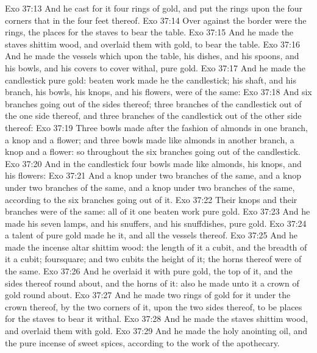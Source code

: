 \vs Exo 37:13 And he cast for it four rings of gold, and put the rings upon the four corners that  in the four feet thereof.
\vs Exo 37:14 Over against the border were the rings, the places for the staves to bear the table.
\vs Exo 37:15 And he made the staves  shittim wood, and overlaid them with gold, to bear the table.
\vs Exo 37:16 And he made the vessels which  upon the table, his dishes, and his spoons, and his bowls, and his covers to cover withal,  pure gold.
\vs Exo 37:17 And he made the candlestick  pure gold:  beaten work made he the candlestick; his shaft, and his branch, his bowls, his knops, and his flowers, were of the same:
\vs Exo 37:18 And six branches going out of the sides thereof; three branches of the candlestick out of the one side thereof, and three branches of the candlestick out of the other side thereof:
\vs Exo 37:19 Three bowls made after the fashion of almonds in one branch, a knop and a flower; and three bowls made like almonds in another branch, a knop and a flower: so throughout the six branches going out of the candlestick.
\vs Exo 37:20 And in the candlestick  four bowls made like almonds, his knops, and his flowers:
\vs Exo 37:21 And a knop under two branches of the same, and a knop under two branches of the same, and a knop under two branches of the same, according to the six branches going out of it.
\vs Exo 37:22 Their knops and their branches were of the same: all of it  one beaten work  pure gold.
\vs Exo 37:23 And he made his seven lamps, and his snuffers, and his snuffdishes,  pure gold.
\vs Exo 37:24  a talent of pure gold made he it, and all the vessels thereof.
\vs Exo 37:25 And he made the incense altar  shittim wood: the length of it  a cubit, and the breadth of it a cubit;  foursquare; and two cubits  the height of it; the horns thereof were of the same.
\vs Exo 37:26 And he overlaid it with pure gold,  the top of it, and the sides thereof round about, and the horns of it: also he made unto it a crown of gold round about.
\vs Exo 37:27 And he made two rings of gold for it under the crown thereof, by the two corners of it, upon the two sides thereof, to be places for the staves to bear it withal.
\vs Exo 37:28 And he made the staves  shittim wood, and overlaid them with gold.
\vs Exo 37:29 And he made the holy anointing oil, and the pure incense of sweet spices, according to the work of the apothecary.
